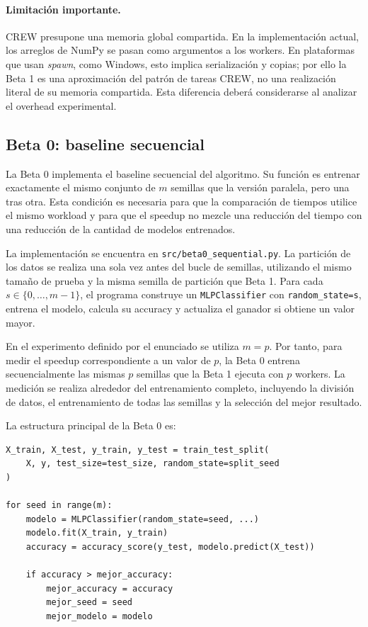 \documentclass[11pt,a4paper]{article}
\begin{document}
\paragraph{Limitación importante.}
CREW presupone una memoria global compartida. En la implementación actual, los arreglos
de NumPy se pasan como argumentos a los workers. En plataformas que usan
\emph{spawn}, como Windows, esto implica serialización y copias; por ello la Beta 1 es
una aproximación del patrón de tareas CREW, no una realización literal de su memoria
compartida. Esta diferencia deberá considerarse al analizar el overhead experimental.

\subsection{Beta 0: baseline secuencial}

La Beta 0 implementa el baseline secuencial del algoritmo. Su función es entrenar
exactamente el mismo conjunto de $m$ semillas que la versión paralela, pero una tras
otra. Esta condición es necesaria para que la comparación de tiempos utilice el mismo
workload y para que el speedup no mezcle una reducción del tiempo con una reducción de
la cantidad de modelos entrenados.

La implementación se encuentra en\linebreak
\texttt{src/beta0\_sequential.py}. La partición de los datos se realiza una sola vez
antes del bucle de semillas, utilizando el mismo tamaño de prueba y la misma semilla de
partición que Beta 1. Para cada $s\in\{0,\ldots,m-1\}$, el programa construye un
\texttt{MLPClassifier} con \texttt{random\_state=s}, entrena el modelo, calcula su
accuracy y actualiza el ganador si obtiene un valor mayor.

En el experimento definido por el enunciado se utiliza $m=p$. Por tanto, para medir el
speedup correspondiente a un valor de $p$, la Beta 0 entrena secuencialmente las mismas
$p$ semillas que la Beta 1 ejecuta con $p$ workers. La medición se realiza alrededor del
entrenamiento completo, incluyendo la división de datos, el entrenamiento de todas las
semillas y la selección del mejor resultado.

La estructura principal de la Beta 0 es:

\begin{lstlisting}
X_train, X_test, y_train, y_test = train_test_split(
    X, y, test_size=test_size, random_state=split_seed
)

for seed in range(m):
    modelo = MLPClassifier(random_state=seed, ...)
    modelo.fit(X_train, y_train)
    accuracy = accuracy_score(y_test, modelo.predict(X_test))

    if accuracy > mejor_accuracy:
        mejor_accuracy = accuracy
        mejor_seed = seed
        mejor_modelo = modelo
\end{lstlisting}
\end{document}

